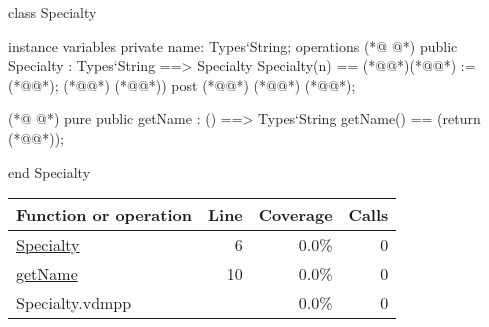 \begin{vdmpp}[breaklines=true]
class Specialty

instance variables
  private name: Types`String;
operations
(*@
\label{Specialty:6}
@*)
 public Specialty : Types`String ==> Specialty
  Specialty(n) == (*@\vdmnotcovered{(}@*)(*@@*) := (*@@*); (*@@*) (*@@*))
 post (*@@*) (*@\vdmnotcovered{=}@*) (*@@*);
  
(*@
\label{getName:10}
@*)
 pure public getName : () ==> Types`String
  getName() == (return (*@@*));

end Specialty
\end{vdmpp}
\bigskip
\begin{longtable}{|l|r|r|r|}
\hline
Function or operation & Line & Coverage & Calls \\
\hline
\hline
\hyperref[Specialty:6]{Specialty} & 6&0.0\% & 0 \\
\hline
\hyperref[getName:10]{getName} & 10&0.0\% & 0 \\
\hline
\hline
Specialty.vdmpp & & 0.0\% & 0 \\
\hline
\end{longtable}

